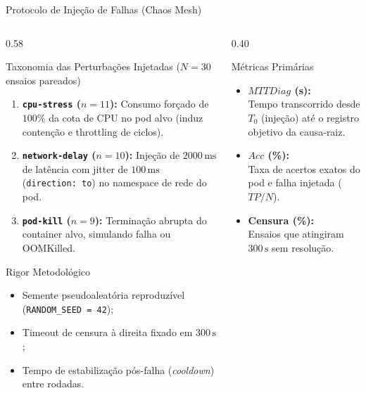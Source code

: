 \documentclass[aspectratio=169, 10pt]{beamer}
\begin{document}
\begin{frame}{Protocolo de Injeção de Falhas (Chaos Mesh)}
  \vspace{-0.8ex}
  \begin{columns}[T]
    \begin{column}{0.58\textwidth}
      \begin{block}{\footnotesize Taxonomia das Perturbações Injetadas ($N=30$ ensaios pareados)}
        \footnotesize
        \begin{enumerate}
          \item \textbf{\texttt{cpu-stress} ($n=11$):} Consumo forçado de $100\%$ da cota de CPU no pod alvo (induz contenção e throttling de ciclos).
          \item \textbf{\texttt{network-delay} ($n=10$):} Injeção de $2000\,\text{ms}$ de latência com jitter de $100\,\text{ms}$ (\texttt{direction: to}) no namespace de rede do pod.
          \item \textbf{\texttt{pod-kill} ($n=9$):} Terminação abrupta do container alvo, simulando falha ou OOMKilled.
        \end{enumerate}
      \end{block}
      \vspace{-0.6ex}
      \begin{exampleblock}{\footnotesize Rigor Metodológico}
        \footnotesize
        \begin{itemize}
          \item Semente pseudoaleatória reproduzível (\texttt{RANDOM\_SEED = 42});
          \item Timeout de censura à direita fixado em $300\,\text{s}$;
          \item Tempo de estabilização pós-falha (\textit{cooldown}) entre rodadas.
        \end{itemize}
      \end{exampleblock}
    \end{column}
    
    \begin{column}{0.40\textwidth}
      \begin{alertblock}{\footnotesize Métricas Primárias}
        \footnotesize
        \begin{itemize}
          \item \textbf{$MTTDiag$ (s):}\\
            Tempo transcorrido desde $T_0$ (injeção) até o registro objetivo da causa-raiz.
          \item \textbf{$Acc$ (\%):}\\
            Taxa de acertos exatos do pod e falha injetada ($TP / N$).
          \item \textbf{Censura (\%):}\\
            Ensaios que atingiram $300\,\text{s}$ sem resolução.
        \end{itemize}
      \end{alertblock}
    \end{column}
  \end{columns}
\end{frame}
\end{document}

